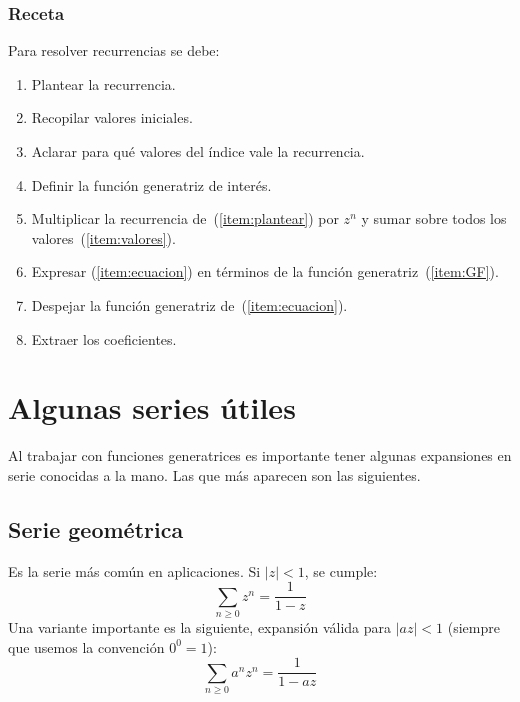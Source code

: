 \subsubsection*{Receta}

  Para resolver recurrencias se debe:
  \begin{enumerate}
  \item\label{item:plantear}
    Plantear la recurrencia.
  \item
    Recopilar valores iniciales.
  \item\label{item:valores}
    Aclarar para qué valores del índice vale la recurrencia.
  \item\label{item:GF}
    Definir la función generatriz de interés.
  \item\label{item:ecuacion}
    Multiplicar la recurrencia de~(\ref{item:plantear})
    por \(z^n\)
    y sumar sobre todos los valores~(\ref{item:valores}).
  \item
    Expresar (\ref{item:ecuacion})
    en términos de la función generatriz~(\ref{item:GF}).
  \item
    Despejar la función generatriz de~(\ref{item:ecuacion}).
  \item
    Extraer los coeficientes.
  \end{enumerate}

\section{Algunas series útiles}
\label{ref:series-utiles}

  Al trabajar con funciones generatrices
  es importante tener algunas expansiones en serie
  conocidas a la mano.
  Las que más aparecen son las siguientes.

\subsection{Serie geométrica}
\label{sec:serie-geometrica}

  Es la serie más común en aplicaciones.
  Si \(\lvert z \rvert < 1\),
  se cumple:
  \begin{equation}
    \label{eq:serie-geometrica-b}
    \sum_{n \ge 0} z^n
      = \frac{1}{1 - z}
  \end{equation}
  Una variante importante es la siguiente,
  expansión válida para \(\lvert a z \rvert < 1\)
  (siempre que usemos la convención \(0^0 = 1\)):
  \begin{equation}
    \label{eq:serie-geometrica-c}
    \sum_{n \ge 0} a^n z^n
      = \frac{1}{1 - a z}
  \end{equation}

